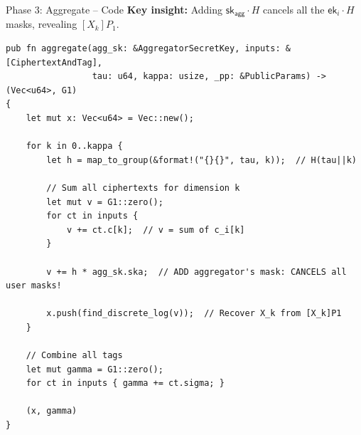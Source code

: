 \documentclass[aspectratio=169,10pt]{beamer}
\begin{document}
\begin{frame}[fragile]{Phase 3: Aggregate -- Code}
    \textbf{Key insight:} Adding $\mathsf{sk}_{\mathsf{agg}} \cdot H$ cancels all the $\mathsf{ek}_i \cdot H$ masks, revealing $[X_k]P_1$.

    \vspace{0.3em}
\begin{lstlisting}[style=rust]
pub fn aggregate(agg_sk: &AggregatorSecretKey, inputs: &[CiphertextAndTag],
                 tau: u64, kappa: usize, _pp: &PublicParams) -> (Vec<u64>, G1)
{
    let mut x: Vec<u64> = Vec::new();

    for k in 0..kappa {
        let h = map_to_group(&format!("{}{}", tau, k));  // H(tau||k)

        // Sum all ciphertexts for dimension k
        let mut v = G1::zero();
        for ct in inputs {
            v += ct.c[k];  // v = sum of c_i[k]
        }

        v += h * agg_sk.ska;  // ADD aggregator's mask: CANCELS all user masks!

        x.push(find_discrete_log(v));  // Recover X_k from [X_k]P1
    }

    // Combine all tags
    let mut gamma = G1::zero();
    for ct in inputs { gamma += ct.sigma; }

    (x, gamma)
}
\end{lstlisting}
\end{frame}
\end{document}
